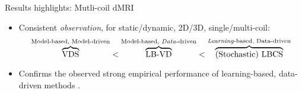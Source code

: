 \begin{frame}{Results highlights: Mutli-coil dMRI}


        \pause
        \begin{itemize}
            \item Consistent \textit{observation}, for static/dynamic, 2D/3D, single/multi-coil:
            $$\overbrace{\text{VDS}}^{\text{Model-based, Model-driven}} < \overbrace{\text{LB-VD}}^{\text{Model-based, \textit{Data}-driven}}< \overbrace{\text{(Stochastic) LBCS}}^{\text{\textit{Learning}-based, Data-driven}}$$
            \item Confirms the observed strong empirical performance of learning-based, data-driven methods \parencite{chauffert2013variable,zijlstra2016evaluation}.
        \end{itemize}
        
         
        \end{frame}

        

